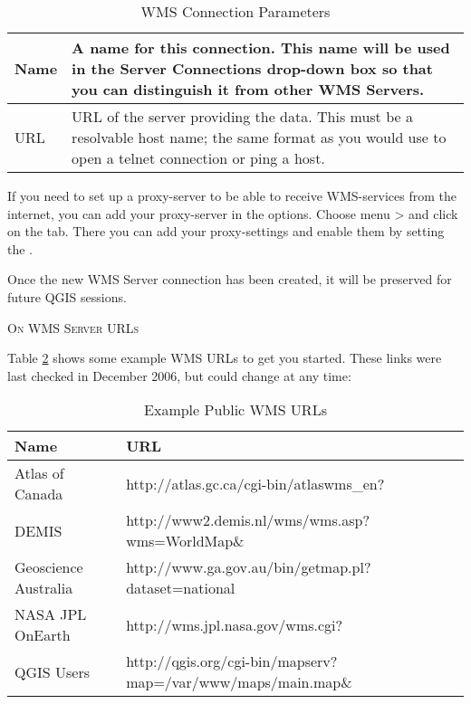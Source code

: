 \begin{table}[ht]
\centering
\caption{WMS Connection Parameters}\label{tab:wms_connection_parms}\medskip
 \begin{tabular}{|l|p{5in}|}
\hline Name & A name for this connection.  This name will be used in the
 Server Connections drop-down box so that you can distinguish it from
 other WMS Servers. \\
\hline URL \index{WMS!URL} & URL of the server providing the data.
 This must be a resolvable host name; the same format as you would use 
 to open a telnet connection or ping a host. \\
\hline
\end{tabular}
\end{table}

If you need to set up a proxy-server to be able to receive WMS-services
from the internet, you can add your proxy-server in the options.
Choose menu  > 
and click on the  tab. There you can add your proxy-settings 
and enable them by setting the .

Once the new WMS Server connection has been created, it will be 
preserved for future QGIS sessions.

\begin{Tip}[ht]\caption{\textsc{On WMS Server URLs}}
\end{Tip}

Table \ref{tab:wms_example_urls} shows some example WMS URLs to get you started.
These links were last checked in December 2006, but could change at any time:


\begin{table}[ht]
\centering
\caption{Example Public WMS URLs}\label{tab:wms_example_urls}\medskip
 \begin{tabular}{|l|l|}
\hline \textbf{Name}        & \textbf{URL} \\
\hline Atlas of Canada      & http://atlas.gc.ca/cgi-bin/atlaswms\_en? \\
\hline DEMIS                & http://www2.demis.nl/wms/wms.asp?wms=WorldMap\& \\
\hline Geoscience Australia & http://www.ga.gov.au/bin/getmap.pl?dataset=national \\
\hline NASA JPL OnEarth     & http://wms.jpl.nasa.gov/wms.cgi? \\
\hline QGIS Users           & http://qgis.org/cgi-bin/mapserv?map=/var/www/maps/main.map\& \\
\hline
\end{tabular}
\end{table}

